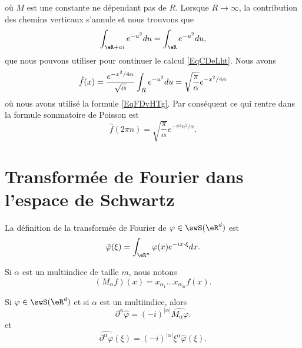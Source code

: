 \begin{example}
\begin{equation}
    \end{equation}
    où \( M\) est une constante ne dépendant pas de \( R\). Lorsque \( R\to \infty\), la contribution des chemins verticaux s'annule et nous trouvons que
    \begin{equation}    \label{EqjrNxLr}
        \int_{\eR+ai} e^{-u^2}du=\int_{\eR} e^{-u^2}du,
    \end{equation}
    que nous pouvons utiliser pour continuer le calcul \eqref{EqCDeLht}. Nous avons
    \begin{equation}
        \hat f(x)= \frac{ e^{-x^2/4\alpha}}{\sqrt{\alpha}}\int_{R} e^{-u^2}du\\
            =\sqrt{\frac{ \pi }{ \alpha }} e^{-x^2/4\alpha}
    \end{equation}
    où nous avons utilisé la formule \eqref{EqFDvHTg}. Par conséquent ce qui rentre dans la formule sommatoire de Poisson est
    \begin{equation}
        \hat f(2\pi n)=\sqrt{\frac{ \pi }{ \alpha }} e^{-\pi^2 n^2/\alpha}.
    \end{equation}
\end{example}

\section{Transformée de Fourier dans l'espace de Schwartz}

La définition de la transformée de Fourier de \( \varphi\in\swS(\eR^d)\) est 
\begin{equation}
    \hat  \varphi(\xi)=\int_{\eR^n}\varphi(x) e^{-ix\cdot \xi}dx.
\end{equation}

Si \( \alpha\) est un multiindice de taille \( m\), nous notons 
\begin{equation}
    (M_{\alpha}f)(x)=x_{\alpha_1}\ldots x_{\alpha_m}f(x).
\end{equation}

\begin{lemma}   \label{LemQPVQjCx}
    Si \( \varphi\in\swS(\eR^d)\) et si \( \alpha\) est un multiindice, alors
    \begin{equation}
        \partial^{\alpha}\hat\varphi=(-i)^{| \alpha |}\widehat{M_{\alpha}\varphi}.
    \end{equation}
    et
    \begin{equation}
        \widehat{\partial^{\alpha}\varphi}(\xi)=(-i)^{| \alpha |}\xi^{\alpha}\hat\varphi(\xi).
    \end{equation}
\end{lemma}

